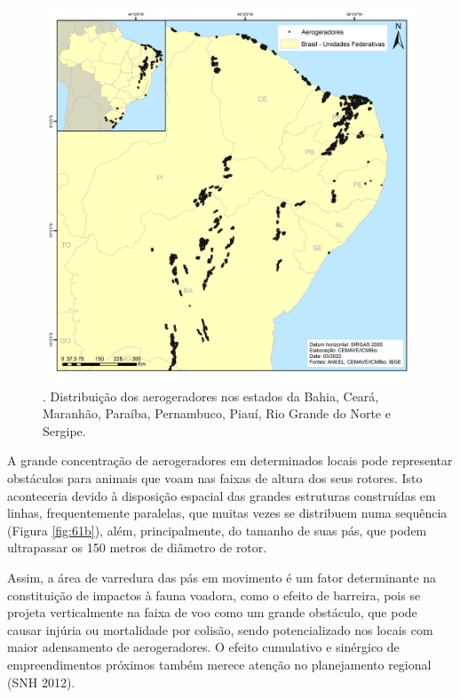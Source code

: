\documentclass[
  oneside]{scrbook}
\begin{document}
\begin{figure}[H]

{\centering \includegraphics[width=0.75\linewidth]{imagens/cap07/Figura_7.41} 

}

\caption{. Distribuição dos aerogeradores nos estados da Bahia, Ceará, Maranhão, Paraíba, Pernambuco, Piauí, Rio Grande do Norte e Sergipe.}\label{fig:61a}
\end{figure}

\begin{blackbox}
A grande concentração de aerogeradores em determinados locais pode representar obstáculos para animais que voam nas faixas de altura dos seus rotores. Isto aconteceria devido à disposição espacial das grandes estruturas construídas em linhas, frequentemente paralelas, que muitas vezes se distribuem numa sequência (Figura \ref{fig:61b}), além, principalmente, do tamanho de suas pás, que podem ultrapassar os 150 metros de diâmetro de rotor.

Assim, a área de varredura das pás em movimento é um fator determinante na constituição de impactos à fauna voadora, como o efeito de barreira, pois se projeta verticalmente na faixa de voo como um grande obstáculo, que pode causar injúria ou mortalidade por colisão, sendo potencializado nos locais com maior adensamento de aerogeradores. O efeito cumulativo e sinérgico de empreendimentos próximos também merece atenção no planejamento regional (SNH 2012).

\end{blackbox}
\end{document}
